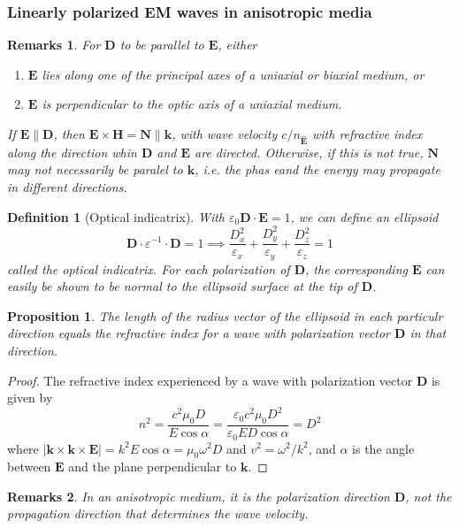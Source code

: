 \documentclass[a4paper]{article}
\newtheorem{remarks}{Remarks}[section]
\theoremstyle{new}
\newtheorem{defi}{Definition}[section]
\newtheorem{prop}{Proposition}[section]
\begin{document}
\subsubsection{Linearly polarized EM waves in anisotropic media}
\begin{remarks}
For $\mathbf{D}$ to be parallel to $\mathbf{E}$, either
\begin{enumerate}
    \item $\mathbf{E}$ lies along one of the principal axes of a uniaxial or biaxial medium, or
    \item $\mathbf{E}$ is perpendicular to the optic axis of a uniaxial medium.
\end{enumerate}
If $\mathbf{E}\parallel\mathbf{D}$, then $\mathbf{E}\times\mathbf{H}=\mathbf{N}\parallel\mathbf{k}$, with wave velocity $c/n_{\mathbf{\hat{E}}}$ with refractive index along the direction whin $\mathbf{D}$ and $\mathbf{E}$ are directed. Otherwise, if this is not true, $\mathbf{N}$ may not necessarily be paralel to $\mathbf{k}$, i.e. the phas eand the energy may propagate in different directions.
\end{remarks}
\begin{defi}[Optical indicatrix]
With $\varepsilon_0\mathbf{D}\cdot\mathbf{E}=1$, we can define an ellipsoid
$$\mathbf{D}\cdot\varepsilon^{-1}\cdot\mathbf{D}=1\implies\frac{D_x^2}{\varepsilon_x}+\frac{D_y^2}{\varepsilon_y}+\frac{D_z^2}{\varepsilon_z}=1$$
called the optical indicatrix. For each polarization of $\mathbf{D}$, the corresponding $\mathbf{E}$ can easily be shown to be normal to the ellipsoid surface at the tip of $\mathbf{D}$.
\end{defi}
\begin{prop}
The length of the radius vector of the ellipsoid in each particulr direction equals the refractive index for a wave with polarization vector $\mathbf{D}$ in that direction.
\end{prop}
\begin{proof}
The refractive index experienced by a wave with polarization vector $\mathbf{D}$ is given by
$$n^2=\frac{c^2\mu_0D}{E\cos\alpha}=\frac{\varepsilon_0c^2\mu_0D^2}{\varepsilon_0ED\cos\alpha}=D^2$$
where $|\mathbf{k}\times\mathbf{k}\times\mathbf{E}|=k^2E\cos\alpha=\mu_0\omega^2D$ and $v^2=\omega^2/k^2$, and $\alpha$ is the angle between $\mathbf{E}$ and the plane perpendicular to $\mathbf{k}$.
\end{proof}
\begin{remarks}
In an anisotropic medium, it is the polarization direction $\mathbf{D}$, not the propagation direction that determines the wave velocity.
\end{remarks}
\end{document}
